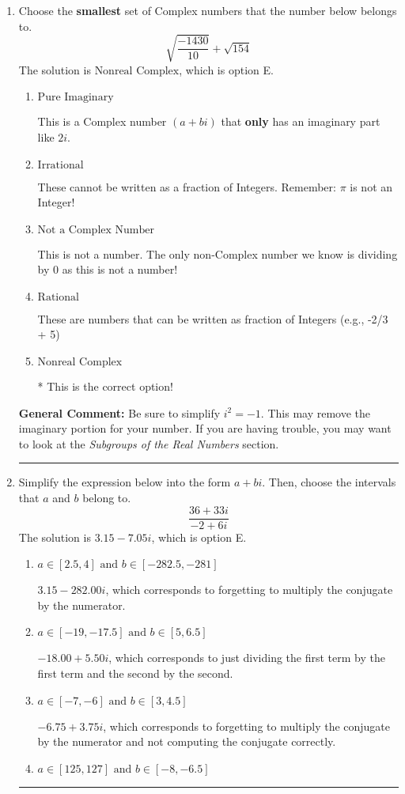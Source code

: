 \documentclass{extbook}[14pt]
\newcommand{\litem}[1]{\item #1

\rule{\textwidth}{0.4pt}}
\begin{document}
\begin{enumerate}
{ Irrational numbers are more than just square root of 3: adding or subtracting values from square root of 3 is also irrational.
}
\litem{
Choose the \textbf{smallest} set of Complex numbers that the number below belongs to.
\[ \sqrt{\frac{-1430}{10}}+\sqrt{154} \]The solution is \( \text{Nonreal Complex} \), which is option E.\begin{enumerate}[label=\Alph*.]
\item \( \text{Pure Imaginary} \)

This is a Complex number $(a+bi)$ that \textbf{only} has an imaginary part like $2i$.
\item \( \text{Irrational} \)

These cannot be written as a fraction of Integers. Remember: $\pi$ is not an Integer!
\item \( \text{Not a Complex Number} \)

This is not a number. The only non-Complex number we know is dividing by 0 as this is not a number!
\item \( \text{Rational} \)

These are numbers that can be written as fraction of Integers (e.g., -2/3 + 5)
\item \( \text{Nonreal Complex} \)

* This is the correct option!
\end{enumerate}

\textbf{General Comment:} Be sure to simplify $i^2 = -1$. This may remove the imaginary portion for your number. If you are having trouble, you may want to look at the \textit{Subgroups of the Real Numbers} section.
}
\litem{
Simplify the expression below into the form $a+bi$. Then, choose the intervals that $a$ and $b$ belong to.
\[ \frac{36 + 33 i}{-2 + 6 i} \]The solution is \( 3.15  - 7.05 i \), which is option E.\begin{enumerate}[label=\Alph*.]
\item \( a \in [2.5, 4] \text{ and } b \in [-282.5, -281] \)

 $3.15  - 282.00 i$, which corresponds to forgetting to multiply the conjugate by the numerator.
\item \( a \in [-19, -17.5] \text{ and } b \in [5, 6.5] \)

 $-18.00  + 5.50 i$, which corresponds to just dividing the first term by the first term and the second by the second.
\item \( a \in [-7, -6] \text{ and } b \in [3, 4.5] \)

 $-6.75  + 3.75 i$, which corresponds to forgetting to multiply the conjugate by the numerator and not computing the conjugate correctly.
\item \( a \in [125, 127] \text{ and } b \in [-8, -6.5] \)


\end{enumerate}}
\end{enumerate}
\end{document}
